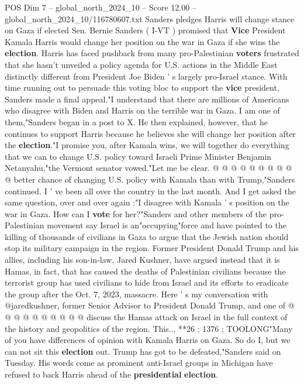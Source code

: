 \begin{textsample}{POS Dim 7 – global\_north\_2024\_10 – Score 12.00 – global\_north\_2024\_10/116780607.txt}  \label{ex:f7_pos_094}
Sanders pledges Harris will change stance on Gaza if elected Sen.
Bernie Sanders ( I-VT ) promised that \textbf{Vice} President Kamala Harris would change her position on the war in Gaza if she wins the \textbf{election}.
Harris has faced pushback from many pro-Palestinian \textbf{voters} frustrated that she hasn't unveiled a policy agenda for U.S. actions in the Middle East distinctly different from President Joe Biden ' s largely pro-Israel stance.
With time running out to persuade this voting bloc to support the \textbf{vice} president, Sanders made a final appeal."I understand that there are millions of Americans who disagree with Biden and Harris on the terrible war in Gaza.
I am one of them,"Sanders began in a post to X.
He then explained, however, that he continues to support Harris because he believes she will change her position after the \textbf{election}."I promise you, after Kamala wins, we will together do everything that we can to change U.S. policy toward Israeli Prime Minister Benjamin Netanyahu,"the Vermont senator vowed."Let me be clear. @ @ @ @ @ @ @ @ @ @ better chance of changing U.S. policy with Kamala than with Trump,"Sanders continued.
I ' ve been all over the country in the last month.
And I get asked the same question, over and over again :"I disagree with Kamala ' s position on the war in Gaza.
How can I \textbf{vote} for her?"Sanders and other members of the pro-Palestinian movement say Israel is an"occupying"force and have pointed to the killing of thousands of civilians in Gaza to argue that the Jewish nation should stop its military campaign in the region.
Former President Donald Trump and his allies, including his son-in-law, Jared Kushner, have argued instead that it is Hamas, in fact, that has caused the deaths of Palestinian civilians because the terrorist group has used civilians to hide from Israel and its efforts to eradicate the group after the Oct. 7, 2023, massacre.
Here ' s my conversation with @jaredkushner, former Senior Advisor to President Donald Trump, and one of @ @ @ @ @ @ @ @ @ @ discuss the Hamas attack on Israel in the full context of the history and geopolitics of the region.
This... **26 ; 1376 ; TOOLONG"Many of you have differences of opinion with Kamala Harris on Gaza.
So do I, but we can not sit this \textbf{election} out.
Trump has got to be defeated,"Sanders said on Tuesday.
His words come as prominent anti-Israel groups in Michigan have refused to back Harris ahead of the \textbf{presidential} \textbf{election}.

\end{textsample}
